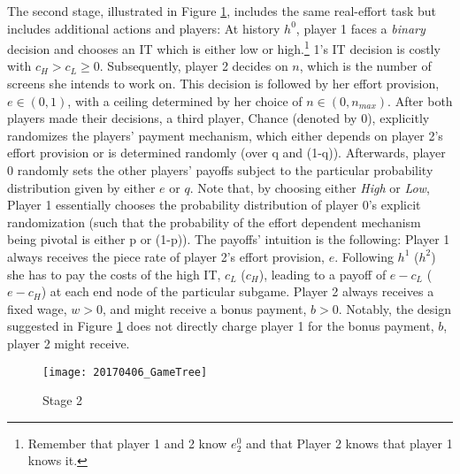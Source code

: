 The second stage, illustrated in Figure \ref{fig:stage2}, includes the same real-effort task but includes additional actions and players: At history $h^0$, player 1 faces a \emph{binary} decision and chooses an IT which is either low or high.\footnote{Remember that player 1 and 2 know $e^0_2$ and that Player 2 knows that player 1 knows it.} 1's IT decision is costly with $c_H>c_L\geq0$. 
Subsequently, player 2 decides on $n$, which is the number of screens she intends to work on. This decision is followed by her effort provision, $e \in (0,1)$, with a ceiling determined by her choice of $n \in (0,n_{max})$. After both players made their decisions, a third player, Chance (denoted by $0$), explicitly randomizes the players' payment mechanism, which either depends on player 2's effort provision or is determined randomly (over q and (1-q)). Afterwards, player $0$ randomly sets the other players' payoffs subject to the particular probability distribution given by either $e$ or $q$. Note that, by choosing either \textit{High} or \textit{Low}, Player 1 essentially chooses the probability distribution of player $0$'s explicit randomization (such that the probability of the effort dependent mechanism being pivotal is either p or (1-p)). The payoffs' intuition is the following: Player 1 always receives the piece rate of player 2's effort provision, $e$. Following $h^1$ ($h^2$) she has to pay the costs of the high IT, $c_L$ ($c_H$), leading to a payoff of $e-c_L$ ($e-c_H$) at each end node of the particular subgame. Player 2 always receives a fixed wage, $w>0$, and might receive a bonus payment, $b>0$. Notably, the design suggested in Figure \ref{fig:stage2} does not directly charge player 1 for the bonus payment, $b$, player 2 might receive.

\begin{figure}
	\texttt{[image: 20170406\_GameTree]}
    \caption{Stage 2}
    \label{fig:stage2}
\end{figure}






